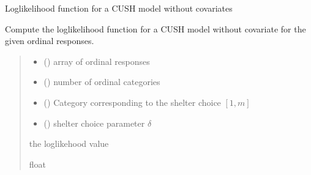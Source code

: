 \documentclass[letterpaper,10pt,english]{sphinxmanual}
\begin{document}

\begin{fulllineitems}
\label{\detokenize{cubmods:cubmods.cush.loglik}}
\pysigstartsignatures
{}
\pysigstopsignatures
\sphinxAtStartPar
Log\sphinxhyphen{}likelihood function for a CUSH model without covariates

\sphinxAtStartPar
Compute the log\sphinxhyphen{}likelihood function for a CUSH model 
without covariate for the given ordinal responses.
\begin{quote}\begin{description}
\begin{itemize}
\item {} 
\sphinxAtStartPar
{} () \textendash{} array of ordinal responses

\item {} 
\sphinxAtStartPar
{} () \textendash{} number of ordinal categories

\item {} 
\sphinxAtStartPar
{} () \textendash{} Category corresponding to the shelter choice \([1,m]\)

\item {} 
\sphinxAtStartPar
{} () \textendash{} shelter choice parameter \(\delta\)

\end{itemize}

\sphinxAtStartPar
the log\sphinxhyphen{}likehood value

\sphinxAtStartPar
float

\end{description}\end{quote}

\end{fulllineitems}

\end{document}
